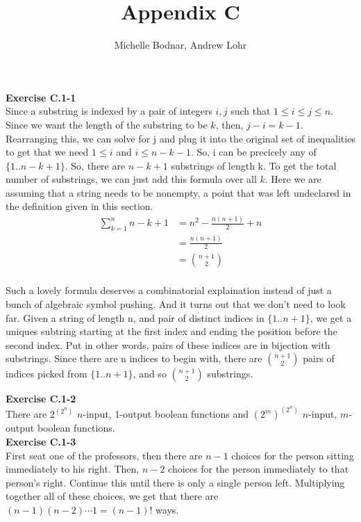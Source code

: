 \documentclass{article}
\title{Appendix C}
\author{Michelle Bodnar, Andrew Lohr}
\begin{document}
\maketitle

\noindent\textbf{Exercise C.1-1}\\

Since a substring is indexed by a pair of integers $i,j$ such that $1\le i \le j \le n$. Since we want the length of the substring to be $k$, then, $j-i = k-1$. Rearranging this, we can solve for j and plug it into the original set of inequalities to get that we need $1\le i$ and $i \le n-k-1$. So, i can be precicely any of $\{1.. n-k+1\}$. So, there are $n-k+1$ substrings of length k. To get the total number of substrings, we can just add this formula over all $k$. Here we are assuming that a string needs to be nonempty, a point that was left undeclared in the definition given in this section.
\begin{align*}
\sum_{k=1}^n n-k+1&= n^2 - \frac{n(n+1)}{2} + n\\
&= \frac{n(n+1)}{2}\\
&=  {{n+1}\choose{2}}\\
\end{align*}

Such a lovely formula deserves a combinatorial explaination instead of just a bunch of algebraic symbol pushing. And it turns out that we don't need to look far. Given a string of length n, and pair of distinct indices in $\{1..n+1\}$, we get a uniques subtring starting at the first index and ending the position before the second index. Put in other words, pairs of these indices are in bijection with substrings. Since there are n indices to begin with, there are ${n+1}\choose{2}$ pairs of indices picked from $\{1..n+1\}$, and so ${n+1}\choose{2}$ substrings. 

\noindent\textbf{Exercise C.1-2}\\

There are $2^{(2^n)}$ $n$-input, 1-output boolean functions and $(2^m)^{(2^n)}$ $n$-input, $m$-output boolean functions. \\



\noindent\textbf{Exercise C.1-3}\\

First seat one of the professors, then there are $n-1$ choices for the person sitting immediately to his right. Then, $n-2$ choices for the person immediately to that person's right. Continue this until there is only a single person left. Multiplying together all of these choices, we get that there are $(n-1)(n-2)\cdots 1 = (n-1)!$ ways.\\
\end{document}
